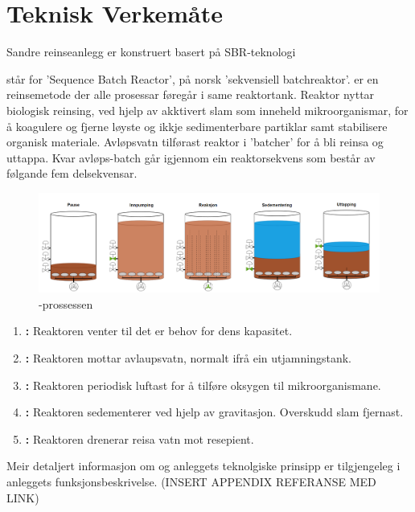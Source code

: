 \newpage
\section{Teknisk Verkemåte}
\thispagestyle{fancy}
Sandre reinseanlegg er konstruert basert på SBR-teknologi

 står for 'Sequence Batch Reactor', på norsk 'sekvensiell batchreaktor'.\newline
{} er en reinsemetode der alle prosessar føregår i same reaktortank. 
Reaktor nyttar biologisk reinsing, ved hjelp av akktivert slam som inneheld mikroorganismar, for å koagulere 
og fjerne løyste og ikkje sedimenterbare partiklar samt stabilisere organisk materiale. 
Avløpsvatn tilførast reaktor i 'batcher' for å bli reinsa og uttappa. 
Kvar avløps-batch går igjennom ein reaktorsekvens som består av følgande fem delsekvensar.
\newline

\begin{figure}[htbp]
    \centering
    \includegraphics[width=1\textwidth]{Figurar/SBR-V2.png}
    \caption{-prossessen}\label{fig:HMI}
\end{figure}


\begin{enumerate}
    \item \textbf{:} Reaktoren venter til det er behov for dens kapasitet.
    \item \textbf{:} Reaktoren mottar avlaupsvatn, normalt ifrå ein utjamningstank.
    \item \textbf{:} Reaktoren periodisk luftast for å tilføre oksygen til mikroorganismane.
    \item \textbf{:} Reaktoren sedementerer ved hjelp av gravitasjon. Overskudd slam fjernast.
    \item \textbf{:} Reaktoren drenerar reisa vatn mot resepient.
\end{enumerate}

Meir detaljert informasjon om  og anleggets teknolgiske prinsipp er tilgjengeleg i anleggets
funksjonsbeskrivelse. (INSERT APPENDIX REFERANSE MED LINK)

